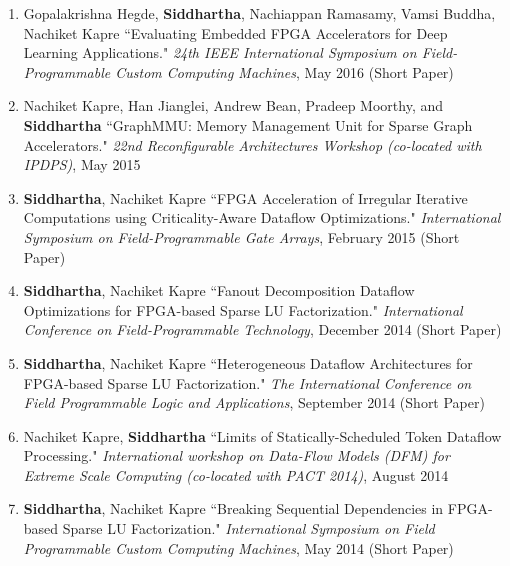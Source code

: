 \documentclass[10pt]{article}
\begin{document}
{\begin{adjustwidth}{-1.25in}{}
\begin{enumerate}
            \item Gopalakrishna Hegde, {\bf Siddhartha}, Nachiappan Ramasamy, Vamsi Buddha, Nachiket Kapre ``Evaluating Embedded FPGA Accelerators for Deep Learning Applications." \emph{24th IEEE International Symposium on Field-Programmable Custom Computing Machines}, May 2016 (Short Paper)
            \item Nachiket Kapre, Han Jianglei, Andrew Bean, Pradeep Moorthy, and {\bf Siddhartha} ``GraphMMU: Memory Management Unit for Sparse Graph Accelerators." \emph{22nd Reconfigurable Architectures Workshop (co-located with IPDPS)}, May 2015
            \item {\bf Siddhartha}, Nachiket Kapre ``FPGA Acceleration of Irregular Iterative Computations using Criticality-Aware Dataflow Optimizations." \emph{International Symposium on Field-Programmable Gate Arrays}, February 2015 (Short Paper)
            \item {\bf Siddhartha}, Nachiket Kapre ``Fanout Decomposition Dataflow Optimizations for FPGA-based Sparse LU Factorization." \emph{International Conference on Field-Programmable Technology}, December 2014 (Short Paper)
            \item {\bf Siddhartha}, Nachiket Kapre ``Heterogeneous Dataflow Architectures for FPGA-based Sparse LU Factorization." \emph{The International Conference on Field Programmable Logic and Applications}, September 2014 (Short Paper)
            \item Nachiket Kapre, {\bf Siddhartha} ``Limits of Statically-Scheduled Token Dataflow Processing." \emph{International workshop on Data-Flow Models (DFM) for Extreme Scale Computing (co-located with PACT 2014)}, August 2014
            \item {\bf Siddhartha}, Nachiket Kapre ``Breaking Sequential Dependencies in FPGA-based Sparse LU Factorization." \emph{International Symposium on Field Programmable Custom Computing Machines}, May 2014 (Short Paper)
        \end{enumerate}

    \end{adjustwidth}
}%
\end{document}
